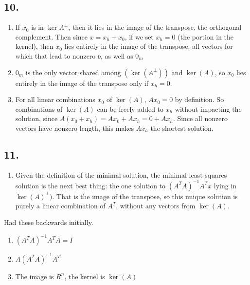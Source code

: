 \documentclass[]{article}
\providecommand{\tightlist}{%
  \setlength{\itemsep}{0pt}\setlength{\parskip}{0pt}}
\begin{document}
\hypertarget{section-8}{%
\subsection{10.}\label{section-8}}

\begin{enumerate}
\def\labelenumi{\alph{enumi}.}
\item
  If \(x_0\) is in \(\ker A^{\perp}\), then it lies in the image of the
  transpose, the orthogonal complement. Then since \(x = x_h + x_0\), if
  we set \(x_h=0\) (the portion in the kernel), then \(x_0\) lies
  entirely in the image of the transpose. all vectors for which that
  lead to nonzero \(b\), as well as \(0_m\)
\item
  \(0_m\) is the only vector shared among \((\ker(A^{\perp}))\) and
  \(\ker(A)\), so \(x_0\) lies entirely in the image of the transpose
  only if \(x_h=0\).
\item
  For all linear combinations \(x_0\) of \(\ker(A)\), \(Ax_0=0\) by
  definition. So combinations of \(\ker(A)\) can be freely added to
  \(x_h\) without impacting the solution, since
  \(A(x_0 +x_h)=Ax_0 + Ax_h=0+Ax_h\). Since all nonzero vectors have
  nonzero length, this makes \(Ax_h\) the shortest solution.
\end{enumerate}

\hypertarget{section-9}{%
\subsection{11.}\label{section-9}}

\begin{enumerate}
\def\labelenumi{\alph{enumi}.}
\tightlist
\item
  Given the definition of the minimal solution, the minimal
  least-squares solution is the next best thing: the one solution to
  \((A^TA)^{-1}A^Tx\) lying in \(\ker(A)^{\perp})\). That is the image
  of the transpose, so this unique solution is purely a linear
  combination of \(A^T\), without any vectors from \(\ker(A)\).
\end{enumerate}

Had these backwards initially.

\begin{enumerate}
\def\labelenumi{\alph{enumi}.}
\setcounter{enumi}{1}
\item
  \((A^TA)^{-1}A^TA=I\)
\item
  \(A(A^TA)^{-1}A^T\)
\item
  The image is \(R^n\), the kernel is \(\ker(A)\)
\end{enumerate}
\end{document}
